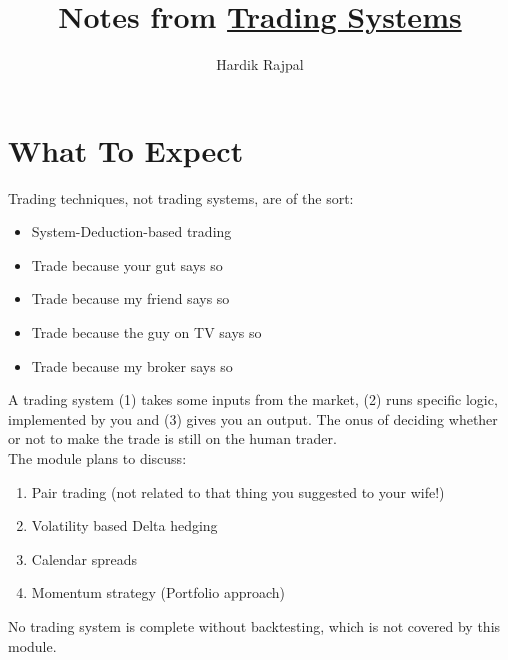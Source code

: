\documentclass{article}
\author{Hardik Rajpal}
\title{Notes from \href{https://zerodha.com/varsity/chapter/what-to-expect/}{Trading Systems}}
\begin{document}
\maketitle
\section{What To Expect}
Trading techniques, not trading systems, are of the sort:
\begin{itemize}
    \item System-Deduction-based trading
    \item Trade because your gut says so
    \item Trade because my friend says so
    \item Trade because the guy on TV says so
    \item Trade because my broker says so
\end{itemize}
A trading system (1) takes some inputs from the market, (2) runs specific logic, implemented
by you and (3) gives you an output. The onus of deciding whether or not to make
the trade is still on the human trader.\\
The module plans to discuss:
\begin{enumerate}
    \item Pair trading (not related to that thing you suggested to your wife!)
    \item Volatility based Delta hedging
    \item Calendar spreads
    \item Momentum strategy (Portfolio approach)
\end{enumerate}
No trading system is complete without backtesting, which is not covered by this module.
\end{document}
